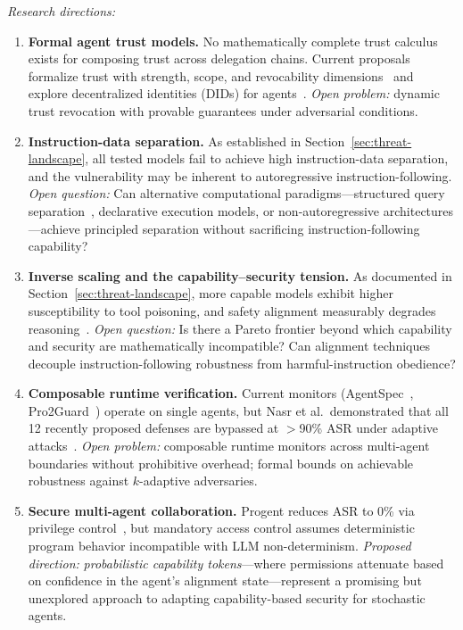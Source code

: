 \emph{Research directions:}
\begin{enumerate}[nosep,leftmargin=1.5em]
    \item \textbf{Formal agent trust models.} No mathematically complete trust calculus exists for composing trust across delegation chains. Current proposals formalize trust with strength, scope, and revocability dimensions~\cite{trustparadox2025} and explore decentralized identities (DIDs) for agents~\cite{rodriguez2025did}. \emph{Open problem:} dynamic trust revocation with provable guarantees under adversarial conditions.
    \item \textbf{Instruction-data separation.} As established in Section~\ref{sec:threat-landscape}, all tested models fail to achieve high instruction-data separation, and the vulnerability may be inherent to autoregressive instruction-following. \emph{Open question:} Can alternative computational paradigms---structured query separation~\cite{chen2025struq}, declarative execution models, or non-autoregressive architectures---achieve principled separation without sacrificing instruction-following capability?
    \item \textbf{Inverse scaling and the capability--security tension.} As documented in Section~\ref{sec:threat-landscape}, more capable models exhibit higher susceptibility to tool poisoning, and safety alignment measurably degrades reasoning~\cite{huang2025safetytax}. \emph{Open question:} Is there a Pareto frontier beyond which capability and security are mathematically incompatible? Can alignment techniques decouple instruction-following robustness from harmful-instruction obedience?
    \item \textbf{Composable runtime verification.} Current monitors (AgentSpec~\cite{wang2025agentspec}, Pro2Guard~\cite{pro2guard2025}) operate on single agents, but Nasr et al.\ demonstrated that all 12 recently proposed defenses are bypassed at $>$90\% ASR under adaptive attacks~\cite{nasr2025attacker}. \emph{Open problem:} composable runtime monitors across multi-agent boundaries without prohibitive overhead; formal bounds on achievable robustness against $k$-adaptive adversaries.
    \item \textbf{Secure multi-agent collaboration.} Progent reduces ASR to 0\% via privilege control~\cite{shi2025progent}, but mandatory access control assumes deterministic program behavior incompatible with LLM non-determinism. \emph{Proposed direction:} \emph{probabilistic capability tokens}---where permissions attenuate based on confidence in the agent's alignment state---represent a promising but unexplored approach to adapting capability-based security for stochastic agents.
\end{enumerate}


